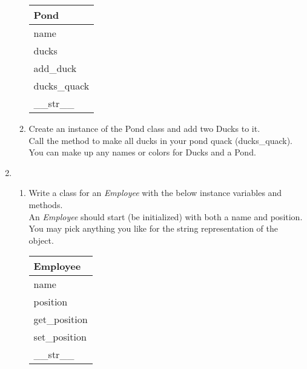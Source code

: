 \documentclass{article}
\begin{document}
\begin{enumerate}
\begin{enumerate}
			\begin{flushright}
			\begin{tabular}{|l|}
				\hline
				Pond\\ \hline  	%
				name\\ ducks\\ \hline		%
				add\_duck\\ ducks\_quack \\ \_\_str\_\_ \\ \hline		%
			\end{tabular}
			\end{flushright}

		\item
			Create an instance of the Pond class and add two Ducks to it.\\
			Call the method to make all ducks in your pond quack (ducks\_quack).\\
			You can make up any names or colors for Ducks and a Pond.\\
	\end{enumerate}
\pagebreak



	\item 
	\begin{enumerate}
		\item 
			Write a class for an \textit{Employee} with the below instance variables and methods.\\
			An \textit{Employee} should start (be initialized) with both a name and position.\\
			You may pick anything you like for the string representation of the object.
			\begin{flushright}
			\begin{tabular}{|l|} \hline
				Employee\\ \hline
				name\\ position\\ \hline
				get\_position\\ set\_position\\ \_\_str\_\_ \\ \hline
			\end{tabular}
			\end{flushright}
		

\end{enumerate}
\end{enumerate}
\end{document}
